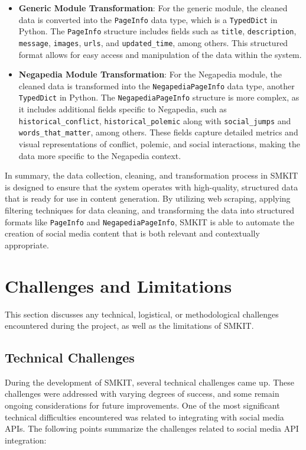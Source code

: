 \begin{itemize}
    \item \textbf{Generic Module Transformation}: For the generic module, the cleaned data is converted into the \texttt{PageInfo} data type, which is a \texttt{TypedDict} in Python. The \texttt{PageInfo} structure includes fields such as \texttt{title}, \texttt{description}, \texttt{message}, \texttt{images}, \texttt{urls}, and \texttt{updated\_time}, among others. This structured format allows for easy access and manipulation of the data within the system.
    \item \textbf{Negapedia Module Transformation}: For the Negapedia module, the cleaned data is transformed into the \texttt{NegapediaPageInfo} data type, another \texttt{TypedDict} in Python. The \texttt{NegapediaPageInfo} structure is more complex, as it includes additional fields specific to Negapedia, such as \texttt{historical\_conflict}, \texttt{historical\_polemic} along with \texttt{social\_jumps} and \texttt{words\_that\_matter}, among others. These fields capture detailed metrics and visual representations of conflict, polemic, and social interactions, making the data more specific to the Negapedia context.
\end{itemize}

In summary, the data collection, cleaning, and transformation process in SMKIT is designed to ensure that the system operates with high-quality, structured data that is ready for use in content generation. By utilizing web scraping, applying filtering techniques for data cleaning, and transforming the data into structured formats like \texttt{PageInfo} and \texttt{NegapediaPageInfo}, SMKIT is able to automate the creation of social media content that is both relevant and contextually appropriate.


\section{Challenges and Limitations}
\label{sec:challenges_and_limitations}
This section discusses any technical, logistical, or methodological challenges encountered during the project, as well as the limitations of SMKIT.

\subsection{Technical Challenges}
\label{subsec:technical_challenges}
During the development of SMKIT, several technical challenges came up. These challenges were addressed with varying degrees of success, and some remain ongoing considerations for future improvements. One of the most significant technical difficulties encountered was related to integrating with social media APIs. The following points summarize the challenges related to social media API integration:

